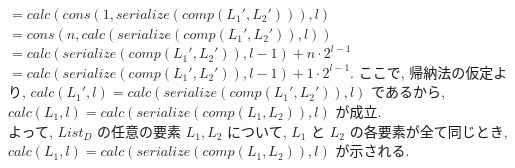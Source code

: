 \documentclass[12pt]{article}
\begin{document}
\begin{itemize}
    \( = calc(cons(1, serialize(comp(L_1', L_2'))), l) \) \\
    \( = cons(n, calc(serialize(comp(L_1', L_2')), l))  \) \\
    \( = calc(serialize(comp(L_1', L_2')), l - 1) + n \cdot 2^{l - 1} \) \\
    \( = calc(serialize(comp(L_1', L_2')), l - 1) + 1 \cdot 2^{l - 1} \).
    ここで, 帰納法の仮定より, \( calc(L_1', l) = calc(serialize(comp(L_1', L_2')), l) \) であるから, \( calc(L_1, l) = calc(serialize(comp(L_1, L_2)), l) \) が成立.\\
    よって, \( List_D \) の任意の要素 \( L_1, L_2 \) について, \( L_1 \) と \( L_2 \) の各要素が全て同じとき, \( calc(L_1, l) = calc(serialize(comp(L_1, L_2)), l) \) が示される.
\end{itemize}
\end{document}
